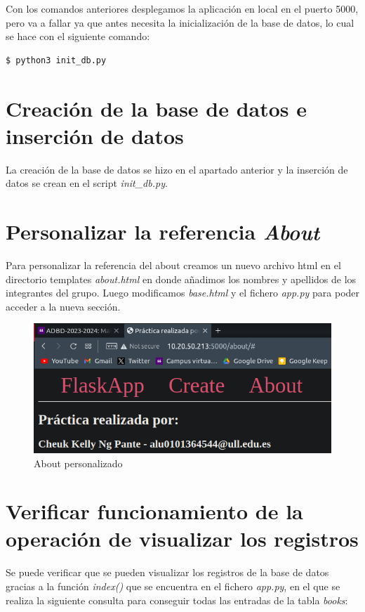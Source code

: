 \documentclass[11pt]{report}
\begin{document}
Con los comandos anteriores desplegamos la aplicación en local en el puerto 5000, pero va a
fallar ya que antes necesita la inicialización de la base de datos, lo cual se hace con el
siguiente comando:
\begin{verbatim}
$ python3 init_db.py
\end{verbatim}

\section{Creación de la base de datos e inserción de datos}
La creación de la base de datos se hizo en el apartado anterior y la inserción de datos se crean en el
script \emph{init\_db.py}.

\section{Personalizar la referencia \emph{About}}
Para personalizar la referencia del about creamos un nuevo archivo html en el directorio
templates \emph{about.html} en donde añadimos los nombres y apellidos de los integrantes del
grupo. Luego modificamos \emph{base.html} y el fichero \emph{app.py} para poder acceder a la nueva
sección.

\begin{figure}[H]
  \centering
  \includegraphics[scale=0.4]{img/about.png}
  \caption{About personalizado}
  \label{fig:about_personalizado}
\end{figure}

\cleardoublepage

\section{Verificar funcionamiento de la operación de visualizar los registros}
Se puede verificar que se pueden visualizar los registros de la base de datos gracias a la función \emph{index()} que
se encuentra en el fichero \emph{app.py}, en el que se realiza la siguiente consulta para conseguir todas las entradas
de la tabla \emph{books}:
\lstset{style=mystyle}

\end{document}
